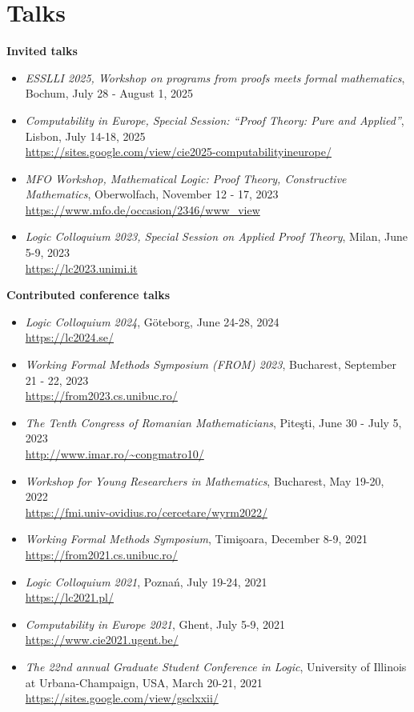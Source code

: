 \documentclass[letterpaper,11pt,oneside]{article}
\begin{document}
\section{Talks}
\noindent
\large{\textbf{Invited talks}} 
\normalsize
\begin{itemize}
    \item \emph{ESSLLI 2025, Workshop on programs from proofs meets formal mathematics},
    Bochum, July 28 - August 1, 2025 \\ 
    \item \emph{Computability in Europe, Special Session: ``Proof Theory: Pure and Applied''},
    Lisbon, July 14-18, 2025 \\ 
    \url{https://sites.google.com/view/cie2025-computabilityineurope/}
    \item \emph{MFO Workshop, Mathematical Logic: Proof Theory, Constructive Mathematics},
    Oberwolfach, November 12 - 17, 2023 \\ 
    \url{https://www.mfo.de/occasion/2346/www_view} 
    \item \emph{Logic Colloquium 2023, Special Session on Applied Proof Theory},
    Milan, June 5-9, 2023 \\ 
    \url{https://lc2023.unimi.it}
\end{itemize}
\normalsize
\mbox{}

\noindent
\large{\textbf{Contributed conference talks}}
\normalsize
\begin{itemize}
    \item \emph{Logic Colloquium 2024},
    G\"{o}teborg, June 24-28, 2024 \\ 
    \url{https://lc2024.se/}
    \item \emph{Working Formal Methods Symposium (FROM) 2023}, 
    Bucharest, September 21 - 22, 2023 \\ 
    \url{https://from2023.cs.unibuc.ro/}
    \item \emph{The Tenth Congress of Romanian Mathematicians},
    Pite\c{s}ti, June 30 - July 5, 2023 \\ 
    \url{http://www.imar.ro/~congmatro10/}
    \item \emph{Workshop for Young Researchers in Mathematics},
    Bucharest, May 19-20, 2022 \\
    \url{https://fmi.univ-ovidius.ro/cercetare/wyrm2022/}
    \item \emph{Working Formal Methods Symposium},
    Timi\c{s}oara, December 8-9, 2021 \\
    \url{https://from2021.cs.unibuc.ro/}
    \item \emph{Logic Colloquium 2021}, 
    Pozna\'n, July 19-24, 2021 \\ 
    \url{https://lc2021.pl/}
    \item \emph{Computability in Europe 2021}, 
    Ghent, July 5-9, 2021 \\ 
    \url{https://www.cie2021.ugent.be/}
    \item \emph{The 22nd annual Graduate Student Conference in Logic}, 
    University of Illinois at Urbana-Champaign, 
    USA, March 20-21, 2021 \\ 
    \url{https://sites.google.com/view/gsclxxii/}
\end{itemize}
\mbox{}
\end{document}
